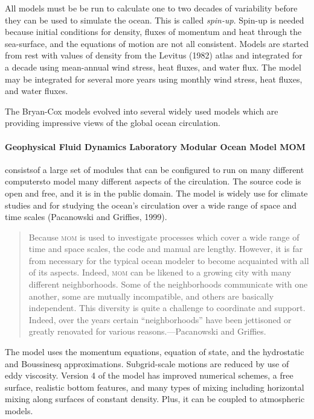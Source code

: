 All models must be be run to calculate one to two decades of variability before they can be used to simulate the ocean. This is called \textit{spin-up}. Spin-up is needed because initial conditions for density, fluxes of momentum and heat through the sea-surface, and the equations of motion are not all consistent. Models are started from rest with values of density from the Levitus (1982) atlas and integrated for a decade using mean-annual wind stress, heat fluxes, and water flux. The model may be integrated for several more years using monthly wind stress, heat fluxes, and water fluxes. 

The Bryan-Cox models evolved into several widely used
models which are providing impressive views of the global ocean circulation. 

\paragraph{Geophysical Fluid Dynamics Laboratory Modular Ocean Model MOM} consistsof a large set of modules that can be configured to run on many different computersto model many different aspects of the circulation. The source code is open and free, and it is in the public domain. The model is widely use for climate studies and for studying the ocean's circulation over a wide range of space and time scales (Pacanowski and Griffies, 1999).
\begin{quote} \small
Because \textsc{mom} is used to investigate processes which cover a wide range of time and space scales, the code and manual are lengthy. However, it is far from necessary for the typical ocean modeler to become acquainted with all of its aspects. Indeed, \textsc{mom} can be likened to a growing city with many different neighborhoods. Some of the neighborhoods communicate with one another, some are mutually incompatible, and others are basically independent. This diversity is quite a challenge to coordinate and support. Indeed, over the years certain ``neighborhoods'' have been jettisoned or greatly renovated for various reasons.---Pacanowski and Griffies.
\end{quote}

The model uses the momentum equations, equation of state, and the hydrostatic and Boussinesq approximations. Subgrid-scale motions are reduced by use of eddy viscosity. Version 4 of the model has improved numerical schemes, a free surface, realistic bottom features, and many types of mixing including horizontal mixing along surfaces of constant density. Plus,
it can be coupled to atmospheric models.

